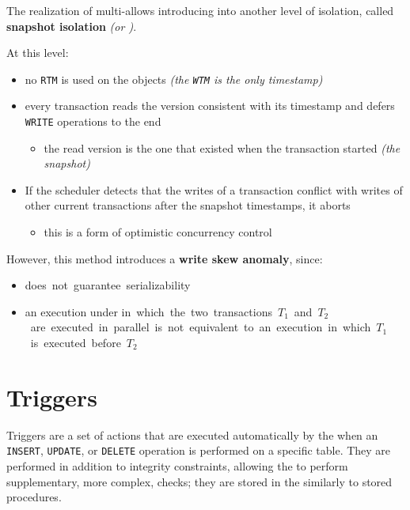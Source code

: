 \documentclass[english]{article}
\begin{document}
The realization of multi-\ts allows introducing into \dbms another level of isolation, called \textbf{snapshot isolation} \textit{(or \si)}.

At this level:

\begin{itemize}
  \item no \texttt{RTM} is used on the objects \textit{(the \texttt{WTM} is the only timestamp)}
  \item every transaction reads the version consistent with its timestamp and defers \texttt{WRITE} operations to the end
        \begin{itemize}[label=\(\rightarrow\)]
          \item the read version is the one that existed when the transaction started \textit{(the snapshot)}
        \end{itemize}
  \item If the scheduler detects that the writes of a transaction conflict with writes of other current transactions after the snapshot timestamps, it aborts
        \begin{itemize}[label=\(\rightarrow\)]
          \item this is a form of optimistic concurrency control
        \end{itemize}
\end{itemize}

\bigskip
However, this method introduces a \textbf{write skew anomaly}, since:

\begin{itemize}
  \item \si does not guarantee serializability
  \item an execution under \si in which the two transactions \(T_1\) and \(T_2\) are executed in parallel is not equivalent to an execution in which \(T_1\) is executed before \(T_2\)
\end{itemize}

\clearpage

\section{Triggers}

Triggers are a set of actions that are executed automatically by the \dbms when an \texttt{INSERT}, \texttt{UPDATE}, or \texttt{DELETE} operation is performed on a specific table.
They are performed in addition to integrity constraints, allowing the \dbms to perform supplementary, more complex, checks;
they are stored in the \dbms similarly to stored procedures.
\end{document}
